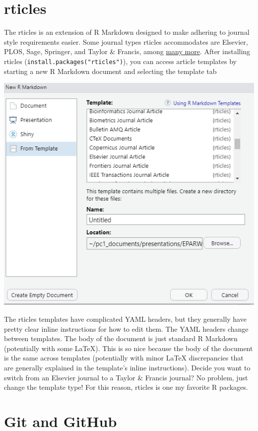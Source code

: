 \documentclass[
]{book}
\begin{document}
\hypertarget{rticles}{%
\section{rticles}\label{rticles}}

The rticles is an extension of R Markdown designed to make adhering to journal style requirements easier. Some journal types rticles accommodates are Elsevier, PLOS, Sage, Springer, and Taylor \& Francis, among \href{https://github.com/rstudio/rticles}{many more}. After installing rticles (\texttt{install.packages("rticles")}), you can access article templates by starting a new R Markdown document and selecting the template tab

\includegraphics[width=1\linewidth]{images/rmark2}

The rticles templates have complicated YAML headers, but they generally have pretty clear inline instructions for how to edit them. The YAML headers change between templates. The body of the document is just standard R Markdown (potentially with some LaTeX). This is so nice because the body of the document is the same across templates (potentially with minor LaTeX discrepancies that are generally explained in the template's inline instructions). Decide you want to switch from an Elsevier journal to a Taylor \& Francis journal? No problem, just change the template type! For this reason, rticles is one my favorite R packages.

\hypertarget{git-and-github}{%
\section{Git and GitHub}\label{git-and-github}}
\end{document}
